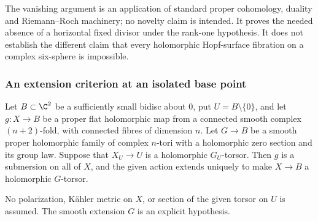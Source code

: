 The vanishing argument is an application of standard proper
cohomology, duality and Riemann--Roch machinery; no novelty
claim is intended.  It proves the needed absence of a
horizontal fixed divisor under the rank-one hypothesis.
It does not establish the different claim that every
holomorphic Hopf-surface fibration on a complex six-sphere
is impossible.

\subsubsection*{An extension criterion at an isolated base point}

\begin{proposition}
Let $B\subset\C^2$ be a sufficiently small bidisc about $0$, put
$U=B\setminus\{0\}$, and let $g:X\to B$ be a proper flat
holomorphic map from a connected smooth complex $(n+2)$-fold,
with connected fibres of dimension $n$.  Let $G\to B$ be a
smooth proper holomorphic family of complex $n$-tori with a
holomorphic zero section and its group law.  Suppose that
$X_U\to U$ is a holomorphic $G_U$-torsor.  Then $g$ is a
submersion on all of $X$, and the given action extends uniquely
to make $X\to B$ a holomorphic $G$-torsor.

No polarization, K\"ahler metric on $X$, or section of the
given torsor on $U$ is assumed.  The smooth extension $G$ is
an explicit hypothesis.
\end{proposition}
